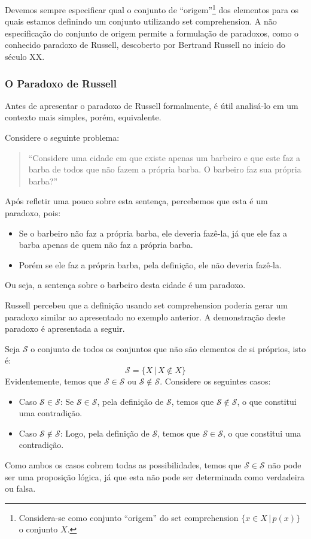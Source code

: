 Devemos sempre especificar qual o conjunto de
``origem''\footnote{Considera-se como conjunto ``origem'' do set
  comprehension $\{x\in X\,|\,p(x)\}$ o conjunto $X$.} dos elementos
para os quais estamos definindo um conjunto utilizando set comprehension.
A não especificação do conjunto de origem permite a formulação de
paradoxos, como o conhecido paradoxo de Russell, descoberto por
Bertrand Russell no início do século XX.

\subsubsection{O Paradoxo de Russell}

Antes de apresentar o paradoxo de Russell formalmente, é útil
analisá-lo em um contexto mais simples, porém, equivalente.

\begin{Example}
Considere o seguinte problema:

\begin{quote}
``Considere uma cidade em que existe apenas um barbeiro e que este faz a
barba de todos que não fazem a própria barba. O barbeiro faz sua
própria barba?''
\end{quote}

Após refletir uma pouco sobre esta sentença, percebemos que esta é um
paradoxo, pois:
\begin{itemize}
  \item Se o barbeiro não faz a própria barba, ele deveria fazê-la, já
    que ele faz a barba apenas de quem não faz a própria barba.
  \item Porém se ele faz a própria barba, pela definição, ele não
    deveria fazê-la.
\end{itemize}

Ou seja, a sentença sobre o barbeiro desta cidade é um paradoxo.
\end{Example}

Russell percebeu que a definição usando set comprehension poderia
gerar um paradoxo similar ao apresentado no exemplo
anterior. A demonstração deste paradoxo é apresentada a seguir.

Seja $\mathcal{S}$ o conjunto de todos os conjuntos que não
são elementos de si próprios, isto é:
\[\mathcal{S} =\{X\,|\,X\not\in X\}\]
Evidentemente, temos que $\mathcal{S} \in \mathcal{S}$ ou $\mathcal{S}
\not\in \mathcal{S}$. Considere os seguintes casos:
\begin{itemize}
  \item Caso $\mathcal{S} \in \mathcal{S}$: Se $\mathcal{S} \in
    \mathcal{S}$, pela definição de $\mathcal{S}$, temos que
    $\mathcal{S} \not\in \mathcal{S}$, o que constitui uma contradição.
  \item Caso $\mathcal{S} \not\in \mathcal{S}$: Logo, pela definição
    de $\mathcal{S}$, temos que $\mathcal{S} \in \mathcal{S}$, o que
    constitui uma contradição.
\end{itemize}
Como ambos os casos cobrem todas as possibilidades, temos que
$\mathcal{S}\in\mathcal{S}$ não pode ser uma proposição lógica, já que
esta não pode ser determinada como verdadeira ou falsa.

